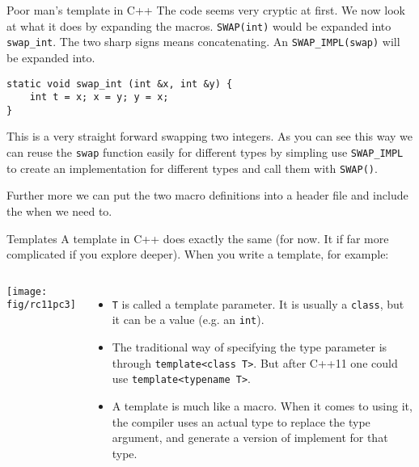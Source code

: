 \begin{frame}[fragile]{Poor man's template in C++}
The code seems very cryptic at first. We now look at what it does by expanding the macros. \texttt{SWAP(int)} would be expanded into \texttt{swap\_int}. The two sharp signs means concatenating. An \texttt{SWAP\_IMPL(swap)} will be expanded into.
\begin{verbatim}
static void swap_int (int &x, int &y) {
    int t = x; x = y; y = x; 
}
\end{verbatim}
This is a very straight forward swapping two integers. As you can see this way we can reuse the \texttt{swap} function easily for different types by simpling use \texttt{SWAP\_IMPL} to create an implementation for different types and call them with \texttt{SWAP()}. 

Further more we can put the two macro definitions into a header file and include the when we need to. 
\end{frame}

\begin{frame}{Templates}
A template in C++ does exactly the same (for now. It if far more complicated if you explore deeper). When you write a template, for example:
\begin{columns}
	
	\texttt{[image: fig/rc11pc3]}
		
	\vspace{-.3in}
	\begin{itemize}
		\small
		\item \texttt{T} is called a template parameter. It is usually a \texttt{class}, but it can be a value (e.g. an \texttt{int}). 
		\item The traditional way of specifying the type parameter is through \texttt{template<class T>}. But after C++11 one could use \texttt{template<typename T>}. 
		\item A template is much like a macro. When it comes to using it, the compiler uses an actual type to replace the type argument, and generate a version of implement for that type.
	\end{itemize}
\end{columns}
\end{frame}


